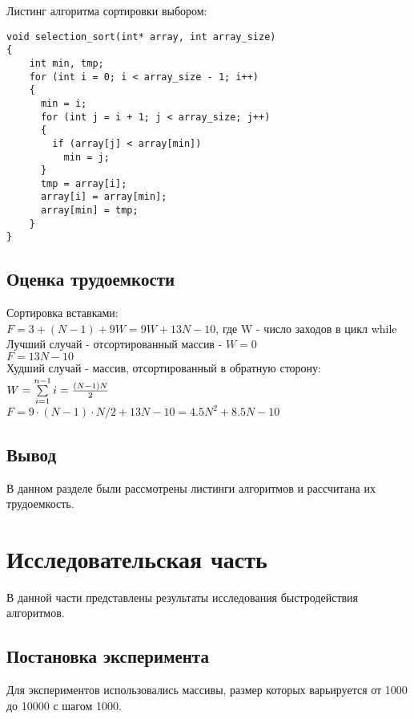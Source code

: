 \documentclass[a4paper, 14pt]{article}
\begin{document}
\newpage
Листинг алгоритма сортировки выбором:
	
	\begin{lstlisting}[label=some-code,caption=Сортировка выбором]
void selection_sort(int* array, int array_size)
{
    int min, tmp;
    for (int i = 0; i < array_size - 1; i++)
    {
      min = i;
      for (int j = i + 1; j < array_size; j++)
      {
        if (array[j] < array[min])
          min = j;
      }
      tmp = array[i];   
      array[i] = array[min];
      array[min] = tmp;
    }
}
\end{lstlisting}
	
	\subsection{Оценка трудоемкости}

Сортировка вставками:\\
$F=3+(N-1) +9W=9W+13N-10$, где W - число заходов в цикл while \\
Лучший случай  - отсортированный массив - $W= 0$\\ 
$F=13N-10$\\
Худший случай - массив, отсортированный в обратную сторону:\\
$W=\sum\limits_{i=1}^{n-1}i={{(N-1)N}\over{2}}$\\
$F=9 \cdot (N-1) \cdot N/2 + 13N -10=4.5N^2+8.5N-10$\\

	\subsection{Вывод}
	
	В данном разделе были рассмотрены листинги алгоритмов и рассчитана их трудоемкость.
	

	\newpage
	\section{Исследовательская часть}
	В данной части представлены результаты  исследования быстродействия алгоритмов.\\

	\subsection{Постановка эксперимента}
	
Для экспериментов использовались массивы, размер которых варьируется от 1000 до 10000 с шагом 1000. \\
\end{document}
